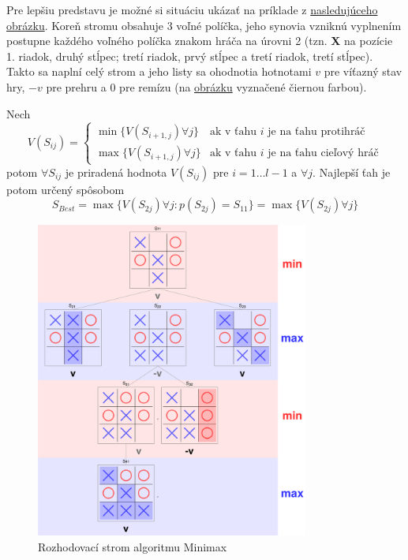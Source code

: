 Pre lepšiu predstavu je možné si situáciu ukázať na príklade z \hyperref[figure:minimax-tree]{nasledujúceho obrázku}.
Koreň stromu obsahuje 3 voľné políčka, jeho synovia vzniknú vyplnením postupne každého voľného políčka znakom hráča na
úrovni 2 (tzn. \textbf{X} na pozície 1. riadok, druhý stĺpec; tretí riadok, prvý stĺpec a tretí riadok, tretí stĺpec).
Takto sa naplní celý strom a jeho listy sa ohodnotia hotnotami $v$ pre víťazný stav hry, $-v$ pre prehru a $0$ pre
remízu (na \hyperref[figure:minimax-tree]{obrázku} vyznačené čiernou farbou).

Nech
\begin{equation}
    V(S_{ij}) =
    \begin{cases}
        \min{\{V(S_{i+1,j}) \forall j\}} & \text{ak v ťahu } i \text{ je na ťahu protihráč} \\
        \max{\{V(S_{i+1,j}) \forall j\}} & \text{ak v ťahu } i \text{ je na ťahu cieľový hráč}
    \end{cases}
\end{equation}
potom $\forall S_{ij}$ je priradená hodnota $V(S_{ij})$ pre $i = 1 \dots l-1$ a $\forall j$.
Najlepší ťah je potom určený spôsobom
\begin{equation}
    S_{Best} = \max{\{V(S_{2j}) \forall j \colon p(S_{2j}) = S_{11}\}} = \max{\{V(S_{2j}) \forall j\}}
\end{equation}
\begin{figure}[H]
    \centering
    \includegraphics[width=0.8\textwidth]{images/minmax-tree.png}
    \caption{Rozhodovací strom algoritmu Minimax}
\end{figure}\label{figure:minimax-tree}

